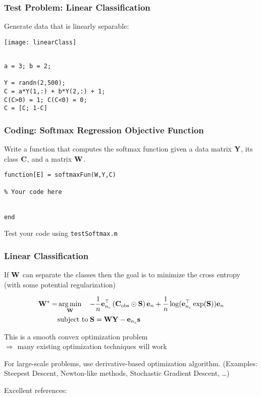 \documentclass[12pt,fleqn,handout]{beamer}
\begin{document}
\begin{frame}[fragile]\frametitle{Test Problem: Linear Classification}

Generate data that is linearly separable:

\begin{center}
	\texttt{[image: linearClass]}
\end{center}
\vspace*{-5mm}
\begin{verbatim}

a = 3; b = 2;

Y = randn(2,500);
C = a*Y(1,:) + b*Y(2,:) + 1;
C(C>0) = 1; C(C<0) = 0;
C = [C; 1-C]

\end{verbatim}


\end{frame}


\begin{frame}[fragile]\frametitle{Coding: Softmax Regression Objective Function}


Write a function that computes the softmax function given a data matrix ${\bf Y}$,
its class ${\bf C}$, and a matrix ${\bf W}$.

\bigskip

\begin{verbatim}
function[E] = softmaxFun(W,Y,C)

% Your code here


end
\end{verbatim}
\begin{center}
	Test your code using \texttt{testSoftmax.m}
\end{center}
\end{frame}


\begin{frame}\frametitle{Linear Classification}

If ${\bf W}$ can separate the classes then the goal is to minimize the cross entropy (with some potential regularization)

\begin{align*}
 {\bf W}^* = & \operatorname*{arg\,min}_{{\bf W}} \quad - \frac{1}{n}{\bf e}_{n_c}^{\top} \left( {\bf C}_{\rm obs} \odot {\bf S}\right) {\bf e}_{n} 
+ \frac{1}{n} \log({\bf e}_{n_c}^\top \exp({\bf S})){\bf e}_n \\
          & \text{subject to} \;{\bf S} = {\bf W} {\bf Y} - {\bf e}_{n_c} {\bf s}
\end{align*}
\pause

This is a smooth convex optimization problem \\ $\Rightarrow$ many existing optimization techniques will work

\bigskip

For large-scale problems, use derivative-based optimization algorithm. (Examples: Steepest Descent, Newton-like methods,  Stochastic Gradient Descent, \ldots)

\bigskip

Excellent references: \cite{NocedalWright2006,BoydVandenberghe2004,Beck2014}
\end{frame}
\end{document}
